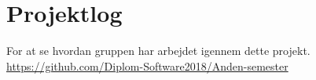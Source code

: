 \chapter{Projektlog}
For at se hvordan gruppen har arbejdet igennem dette projekt. \\
\url{https://github.com/Diplom-Software2018/Anden-semester}

